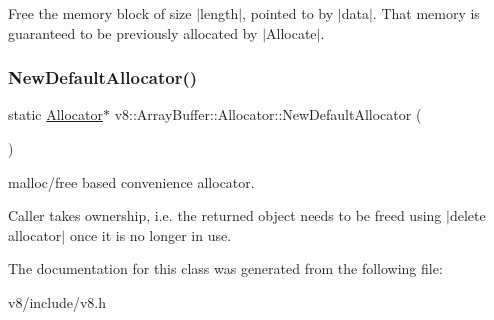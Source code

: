 Free the memory block of size $\vert$length$\vert$, pointed to by $\vert$data$\vert$. That memory is guaranteed to be previously allocated by $\vert$\+Allocate$\vert$. \mbox{\label{classv8_1_1ArrayBuffer_1_1Allocator_ab274d606bbc87a2a41f114d55d6da331}} 
\subsubsection{\texorpdfstring{New\+Default\+Allocator()}{NewDefaultAllocator()}}
{\footnotesize\ttfamily static \mbox{\hyperlink{classv8_1_1ArrayBuffer_1_1Allocator}{Allocator}}$\ast$ v8\+::\+Array\+Buffer\+::\+Allocator\+::\+New\+Default\+Allocator (\begin{DoxyParamCaption}{ }\end{DoxyParamCaption})\hspace{0.3cm}{\ttfamily [static]}}

malloc/free based convenience allocator.

Caller takes ownership, i.\+e. the returned object needs to be freed using $\vert$delete allocator$\vert$ once it is no longer in use. 

The documentation for this class was generated from the following file\+:\begin{DoxyCompactItemize}
\item 
v8/include/v8.\+h\end{DoxyCompactItemize}
